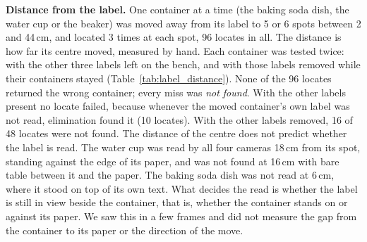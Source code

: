 \documentclass[letterpaper, 10pt, journal, twoside]{IEEEtran}}
\begin{document}
\textbf{Distance from the label.} One container at a time (the baking
soda dish, the water cup or the beaker) was moved away from its label to
5 or 6 spots between 2 and 44\,cm, and located 3 times at each spot, 96
locates in all. The distance is how far its centre moved, measured by
hand. Each container was tested twice: with the other three labels left on
the bench, and with those labels removed while their containers stayed
(Table~\ref{tab:label_distance}). None of the 96 locates returned the
wrong container; every miss was \emph{not found}. With the other labels
present no locate failed, because whenever the moved container's own
label was not read, elimination found it (10 locates). With the other
labels removed, 16 of 48 locates were not found. The distance of the
centre does not predict whether the label is read. The water cup was read
by all four cameras 18\,cm from its spot, standing against the edge of its
paper, and was not found at 16\,cm with bare table between it and the
paper. The baking soda dish was not read at 6\,cm, where it stood on top
of its own text. What decides the read is whether the label is still in
view beside the container, that is, whether the container stands on or
against its paper. We saw this in a few frames and did not measure the gap
from the container to its paper or the direction of the move.
\end{document}

